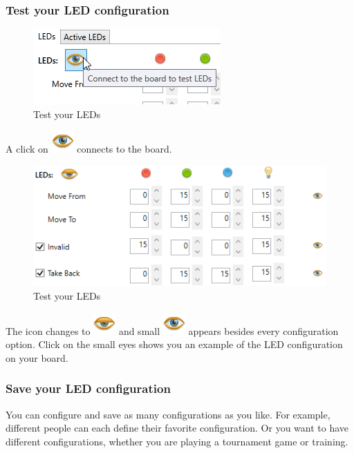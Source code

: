 \documentclass[11pt,a4paper]{article}
\begin{document}
\subsubsection{Test your LED configuration}

\begin{figure}[H]
	\centering
	\includegraphics[scale=1.0]{iChessOne5.png}
	\caption{Test your LEDs }
	\label{fig:ChessnutEvo8}
\end{figure}

A click on \includegraphics[scale=0.4]{eye.png} connects to the board.

\begin{figure}[H]
	\centering
	\includegraphics[scale=1.0]{ChessnutEvo8.png}
	\caption{Test your LEDs }
	\label{fig:ChessnutEvo9}
\end{figure}
The icon changes to \includegraphics[scale=0.4]{eye_half.png} and small \includegraphics[scale=0.3]{eye.png} appears besides every configuration option. Click on the small eyes shows you an example of the LED configuration on your board.

\subsubsection{Save your LED configuration}
You can configure and save as many configurations as you like. For example, different people can each define their favorite configuration. Or you want to have different configurations, whether you are playing a tournament game or training.
\end{document}
